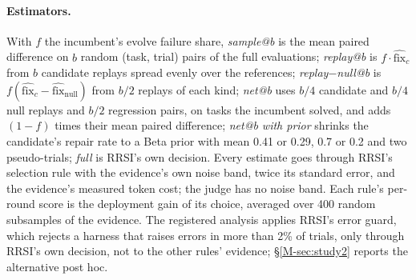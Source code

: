 \documentclass[11pt]{article}
\begin{document}
\paragraph{Estimators.} With $f$ the incumbent's evolve failure share, \emph{sample@b} is the mean paired difference on $b$ random (task, trial) pairs of the full evaluations; \emph{replay@b} is $f\cdot\widehat{\mathrm{fix}}_c$ from $b$ candidate replays spread evenly over the references; \emph{replay$-$null@b} is $f(\widehat{\mathrm{fix}}_c-\widehat{\mathrm{fix}}_{\mathrm{null}})$ from $b/2$ replays of each kind; \emph{net@b} uses $b/4$ candidate and $b/4$ null replays and $b/2$ regression pairs, on tasks the incumbent solved, and adds $(1-f)$ times their mean paired difference; \emph{net@b with prior} shrinks the candidate's repair rate to a Beta prior with mean 0.41 or 0.29, 0.7 or 0.2 and two pseudo-trials; \emph{full} is RRSI's own decision. Every estimate goes through RRSI's selection rule with the evidence's own noise band, twice its standard error, and the evidence's measured token cost; the judge has no noise band. Each rule's per-round score is the deployment gain of its choice, averaged over 400 random subsamples of the evidence. The registered analysis applies RRSI's error guard, which rejects a harness that raises errors in more than 2\% of trials, only through RRSI's own decision, not to the other rules' evidence; \S\ref*{M-sec:study2} reports the alternative post hoc.
\end{document}
